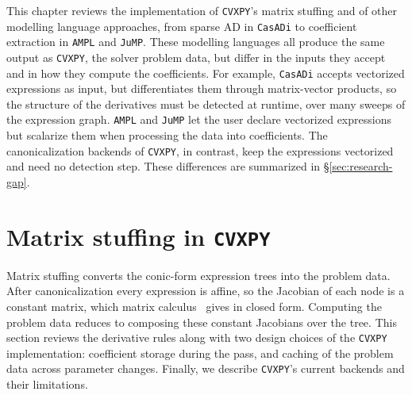 \label{sec:RevLitt}

This chapter reviews the implementation of \texttt{CVXPY}'s matrix stuffing and of other
modelling language approaches, from sparse \ac{AD} in \texttt{CasADi} to coefficient extraction in
\texttt{AMPL} and \texttt{JuMP}. These modelling languages all produce the
same output as \texttt{CVXPY}, the solver problem data, but differ in the inputs they accept
and in how they compute the coefficients. For example, \texttt{CasADi} accepts vectorized
expressions as input, but differentiates them through matrix-vector products, so the structure
of the derivatives must be detected at runtime, over many sweeps of the expression graph.
\texttt{AMPL} and \texttt{JuMP} let the user declare vectorized expressions but scalarize them
when processing the data into coefficients.
The canonicalization backends of \texttt{CVXPY}, in contrast, keep the expressions
vectorized and need no detection step. These differences are summarized in
\S\ref{sec:research-gap}.

\section{Matrix stuffing in \texttt{CVXPY}}\label{sec:matrix-stuffing}

Matrix stuffing converts the conic-form expression trees into the problem data. After
canonicalization every expression is affine, so the Jacobian of
each node is a constant matrix, which matrix calculus~\cite{magnus2019matrix} gives in
closed form. Computing the problem data reduces to composing these constant Jacobians over
the tree. This section reviews the derivative rules along with two design
choices of the \texttt{CVXPY} implementation: coefficient storage during the
pass, and caching of the problem data across parameter changes. Finally,
we describe \texttt{CVXPY}'s current backends and their limitations.

